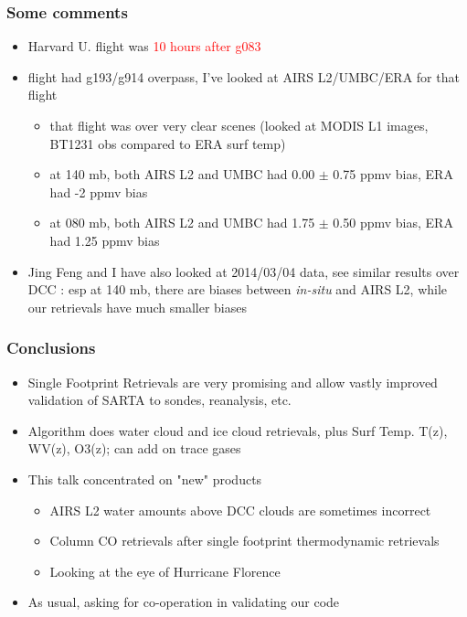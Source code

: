 \documentclass[10pt,t]{beamer}
\begin{document}
\begin{frame}
\frametitle{Some comments}
\begin{itemize}
  \item Harvard U. flight was \textcolor{red}{10 hours after g083}
  \item flight had g193/g914 overpass, I've looked at AIRS L2/UMBC/ERA for that flight
    \begin{itemize}
      \item that flight was over very clear scenes (looked at MODIS L1 images, BT1231 obs compared to ERA surf temp)
      \item at 140 mb, both AIRS L2 and UMBC had 0.00 $\pm$ 0.75 ppmv bias, ERA had -2 ppmv bias
      \item at 080 mb, both AIRS L2 and UMBC had 1.75 $\pm$ 0.50 ppmv bias, ERA had 1.25 ppmv bias      
    \end{itemize}
  \item Jing Feng and I have also looked at 2014/03/04 data, see similar results over DCC : esp at 140 mb, there
        are biases between \emph{in-situ} and AIRS L2, while our retrievals have much smaller biases
\end{itemize}
\end{frame}

\begin{frame}
  \frametitle{Conclusions}
  \begin{itemize}
  \item Single Footprint Retrievals are very promising and allow vastly improved validation of SARTA to sondes, reanalysis, etc.
  \item Algorithm does water cloud and ice cloud retrievals, plus Surf Temp. T(z), WV(z), O3(z); can add on trace gases
  \item This talk concentrated on "new" products
    \begin{itemize}
    \item AIRS L2 water amounts above DCC clouds are sometimes incorrect
    \item Column CO retrievals after single footprint thermodynamic retrievals
    \item Looking at the eye of Hurricane Florence
    \end{itemize}
  \item As usual, asking for co-operation in validating our code
  \end{itemize}
\end{frame}
\end{document}

